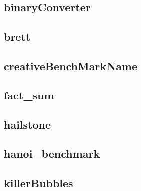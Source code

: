 \newpage
\subsection{binaryConverter}
    \begin{figure}[h]
	    \centering
		
	\end{figure}
    


\newpage
\subsection{brett}
    \begin{figure}[h]
	    \centering
		
	\end{figure}
    


\newpage
\subsection{creativeBenchMarkName}
    \begin{figure}[h]
	    \centering
		
	\end{figure}
    


\newpage
\subsection{fact\_sum}
    \begin{figure}[h]
	    \centering
		
	\end{figure}
    


\newpage
\subsection{hailstone}
    \begin{figure}[h]
	    \centering
		
	\end{figure}
    


\newpage
\subsection{hanoi\_benchmark}
    \begin{figure}[h]
	    \centering
		
	\end{figure}
    


\newpage
\subsection{killerBubbles}
    \begin{figure}[h]
	    \centering
		
	\end{figure}
    


